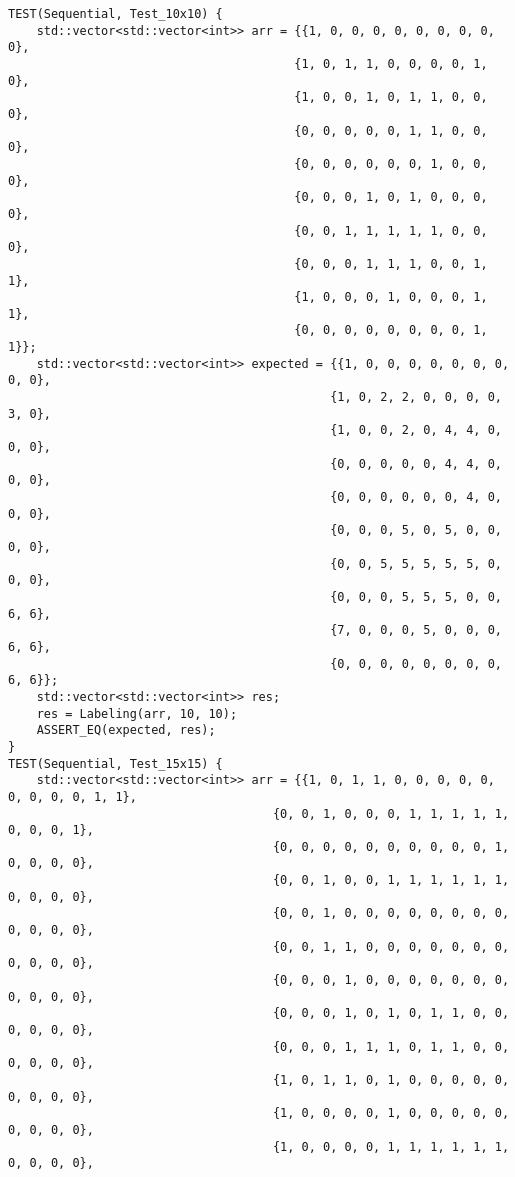 \documentclass{report}
\begin{document}
\begin{lstlisting}
TEST(Sequential, Test_10x10) {
    std::vector<std::vector<int>> arr = {{1, 0, 0, 0, 0, 0, 0, 0, 0, 0},
                                        {1, 0, 1, 1, 0, 0, 0, 0, 1, 0},
                                        {1, 0, 0, 1, 0, 1, 1, 0, 0, 0},
                                        {0, 0, 0, 0, 0, 1, 1, 0, 0, 0},
                                        {0, 0, 0, 0, 0, 0, 1, 0, 0, 0},
                                        {0, 0, 0, 1, 0, 1, 0, 0, 0, 0},
                                        {0, 0, 1, 1, 1, 1, 1, 0, 0, 0},
                                        {0, 0, 0, 1, 1, 1, 0, 0, 1, 1},
                                        {1, 0, 0, 0, 1, 0, 0, 0, 1, 1},
                                        {0, 0, 0, 0, 0, 0, 0, 0, 1, 1}};
    std::vector<std::vector<int>> expected = {{1, 0, 0, 0, 0, 0, 0, 0, 0, 0},
                                             {1, 0, 2, 2, 0, 0, 0, 0, 3, 0},
                                             {1, 0, 0, 2, 0, 4, 4, 0, 0, 0},
                                             {0, 0, 0, 0, 0, 4, 4, 0, 0, 0},
                                             {0, 0, 0, 0, 0, 0, 4, 0, 0, 0},
                                             {0, 0, 0, 5, 0, 5, 0, 0, 0, 0},
                                             {0, 0, 5, 5, 5, 5, 5, 0, 0, 0},
                                             {0, 0, 0, 5, 5, 5, 0, 0, 6, 6},
                                             {7, 0, 0, 0, 5, 0, 0, 0, 6, 6},
                                             {0, 0, 0, 0, 0, 0, 0, 0, 6, 6}};
    std::vector<std::vector<int>> res;
    res = Labeling(arr, 10, 10);
    ASSERT_EQ(expected, res);
}
TEST(Sequential, Test_15x15) {
    std::vector<std::vector<int>> arr = {{1, 0, 1, 1, 0, 0, 0, 0, 0, 0, 0, 0, 0, 1, 1},
                                     {0, 0, 1, 0, 0, 0, 1, 1, 1, 1, 1, 0, 0, 0, 1},
                                     {0, 0, 0, 0, 0, 0, 0, 0, 0, 0, 1, 0, 0, 0, 0},
                                     {0, 0, 1, 0, 0, 1, 1, 1, 1, 1, 1, 0, 0, 0, 0},
                                     {0, 0, 1, 0, 0, 0, 0, 0, 0, 0, 0, 0, 0, 0, 0},
                                     {0, 0, 1, 1, 0, 0, 0, 0, 0, 0, 0, 0, 0, 0, 0},
                                     {0, 0, 0, 1, 0, 0, 0, 0, 0, 0, 0, 0, 0, 0, 0},
                                     {0, 0, 0, 1, 0, 1, 0, 1, 1, 0, 0, 0, 0, 0, 0},
                                     {0, 0, 0, 1, 1, 1, 0, 1, 1, 0, 0, 0, 0, 0, 0},
                                     {1, 0, 1, 1, 0, 1, 0, 0, 0, 0, 0, 0, 0, 0, 0},
                                     {1, 0, 0, 0, 0, 1, 0, 0, 0, 0, 0, 0, 0, 0, 0},
                                     {1, 0, 0, 0, 0, 1, 1, 1, 1, 1, 1, 0, 0, 0, 0},

\end{lstlisting}
\end{document}
